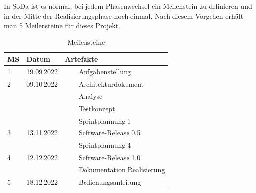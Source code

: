 \documentclass[a4paper, table]{article}
\newcommand{\tabitem}{~~\llap{\textbullet}~~}
\begin{document}
In SoDa ist es normal, bei jedem Phasenwechsel ein Meilenstein zu definieren und in der Mitte der
Realisierungsphase noch einmal. \autocite{jenny_projektmanagement_2016} %
Nach diesem Vorgehen erhält man 5 Meilensteine für dieses Projekt.

\begin{table}[h]
    \centering
    \begin{tabular}{|l|l|l|}
        \hline
        \rowcolor[gray]{.9} MS & Datum & Artefakte \\
        \hline
        1 & 19.09.2022 & \tabitem Aufgabenstellung \\
        \hline
        2 & 09.10.2022 & \tabitem Architekturdokument \\
         & & \tabitem Analyse \\
         & & \tabitem Testkonzept \\
         & & \tabitem Sprintplannung 1 \\
        \hline
        3 & 13.11.2022 & \tabitem Software-Release 0.5 \\
         & & \tabitem Sprintplannung 4 \\
        \hline
        4 & 12.12.2022 & \tabitem Software-Release 1.0 \\
         & & \tabitem Dokumentation Realisierung \\
        \hline
        5 & 18.12.2022 & \tabitem Bedienungsanleitung \\
        \hline
    \end{tabular}
    \caption{Meilensteine}
    \label{tab: Meilensteine}
\end{table}
\clearpage
\end{document}
